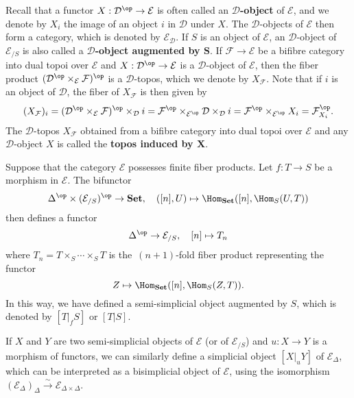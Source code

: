 Recall that a functor $X:\mathcal{D}^{\op}\to \mathcal{E}$ is often called an \textbf{$\mathcal{D}$-object} of $\mathcal{E}$, and we denote by $X_i$ the image of an object $i$ in $\mathcal{D}$ under $X$. The $\mathcal{D}$-objects of $\mathcal{E}$ then form a category, which is denoted by $\mathcal{E}_\mathcal{D}$. If $S$ is an object of $\mathcal{E}$, an $\mathcal{D}$-object of $\mathcal{E}_{/S}$ is also called a \textbf{$\mathcal{D}$-object augmented by $\bm{S}$}. If $\mathcal{F}\to \mathcal{E}$ be a bifibre category into dual topoi over $\mathcal{E}$ and $X:\mathcal{D}^{\op}\to \mathcal{E}$ is a $\mathcal{D}$-object of $\mathcal{E}$, then the fiber product $(\mathcal{D}^{\op}\times_\mathcal{E}\mathcal{F})^{\op}$ is a $\mathcal{D}$-topos, which we denote by $X_\mathcal{F}$. Note that if $i$ is an object of $\mathcal{D}$, the fiber of $X_\mathcal{F}$ is then given by
\begin{equation}\label{topos fibre given by D-object-1}
(X_\mathcal{F})_i=(\mathcal{D}^{\op}\times_\mathcal{E}\mathcal{F})^{\op}\times_\mathcal{D}i=\mathcal{F}^{\op}\times_{\mathcal{E}^{\op}}\mathcal{D}\times_\mathcal{D}i=\mathcal{F}^{\op}\times_{\mathcal{E}^{\op}}X_i=\mathcal{F}_{X_i}^{\op}.
\end{equation}
The $\mathcal{D}$-topos $X_\mathcal{F}$ obtained from a bifibre category into dual topoi over $\mathcal{E}$ and any $\mathcal{D}$-object $X$ is called the \textbf{topos induced by $\bm{X}$}.

\begin{example}\label{topos fibre D-object given by fiber product}
Suppose that the category $\mathcal{E}$ possesses finite fiber products. Let $f:T\to S$ be a morphism in $\mathcal{E}$. The bifunctor
\[\Delta^{\op}\times(\mathcal{E}_{/S})^{\op}\to \mathbf{Set}, \quad ([n],U)\mapsto\Hom_{\mathbf{Set}}([n],\Hom_S(U,T))\]
then defines a functor
\[\Delta^{\op}\to \mathcal{E}_{/S},\quad [n]\mapsto T_n\]
where $T_n=T\times_S\cdots\times_ST$ is the~$(n+1)$-fold fiber product representing the functor
\[Z\mapsto\Hom_{\mathbf{Set}}([n],\Hom_S(Z,T)).\]
In this way, we have defined a semi-simplicial object augmented by $S$, which is denoted by $[T|_fS]$ or $[T|S]$.\par
If $X$ and $Y$ are two semi-simplicial objects of $\mathcal{E}$ (or of $\mathcal{E}_{/S}$) and $u:X\to Y$ is a morphism of functors, we can similarly define a simplicial object $[X|_uY]$ of $\mathcal{E}_{\Delta}$, which can be interpreted as a bisimplicial object of $\mathcal{E}$, using the isomorphism $(\mathcal{E}_{\Delta})_\Delta\stackrel{\sim}{\to }\mathcal{E}_{\Delta\times\Delta}$.
\end{example}

